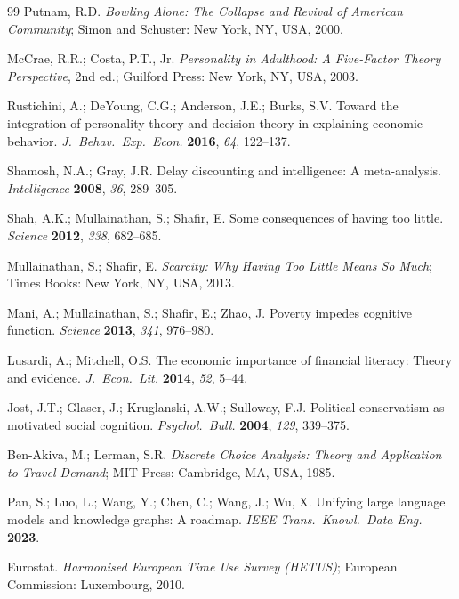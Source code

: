 \documentclass[a4paper,12pt]{article}
\begin{document}
\begin{thebibliography}{99}
Putnam, R.D.
\textit{Bowling Alone: The Collapse and Revival of American Community};
Simon and Schuster: New York, NY, USA, 2000.

McCrae, R.R.; Costa, P.T., Jr.
\textit{Personality in Adulthood: A Five-Factor Theory Perspective}, 2nd ed.;
Guilford Press: New York, NY, USA, 2003.

Rustichini, A.; DeYoung, C.G.; Anderson, J.E.; Burks, S.V.
Toward the integration of personality theory and decision theory in explaining
economic behavior. \textit{J.\ Behav.\ Exp.\ Econ.} \textbf{2016},
\textit{64}, 122--137.

Shamosh, N.A.; Gray, J.R. Delay discounting and intelligence: A meta-analysis.
\textit{Intelligence} \textbf{2008}, \textit{36}, 289--305.

Shah, A.K.; Mullainathan, S.; Shafir, E. Some consequences of having too little.
\textit{Science} \textbf{2012}, \textit{338}, 682--685.

Mullainathan, S.; Shafir, E.
\textit{Scarcity: Why Having Too Little Means So Much};
Times Books: New York, NY, USA, 2013.

Mani, A.; Mullainathan, S.; Shafir, E.; Zhao, J. Poverty impedes cognitive
function. \textit{Science} \textbf{2013}, \textit{341}, 976--980.

Lusardi, A.; Mitchell, O.S. The economic importance of financial literacy:
Theory and evidence.
\textit{J.\ Econ.\ Lit.} \textbf{2014}, \textit{52}, 5--44.

Jost, J.T.; Glaser, J.; Kruglanski, A.W.; Sulloway, F.J. Political conservatism
as motivated social cognition.
\textit{Psychol.\ Bull.} \textbf{2004}, \textit{129}, 339--375.

Ben-Akiva, M.; Lerman, S.R.
\textit{Discrete Choice Analysis: Theory and Application to Travel Demand};
MIT Press: Cambridge, MA, USA, 1985.

Pan, S.; Luo, L.; Wang, Y.; Chen, C.; Wang, J.; Wu, X. Unifying large language
models and knowledge graphs: A roadmap.
\textit{IEEE Trans.\ Knowl.\ Data Eng.} \textbf{2023}.

Eurostat. \textit{Harmonised European Time Use Survey (HETUS)};
European Commission: Luxembourg, 2010.


\end{thebibliography}
\end{document}

